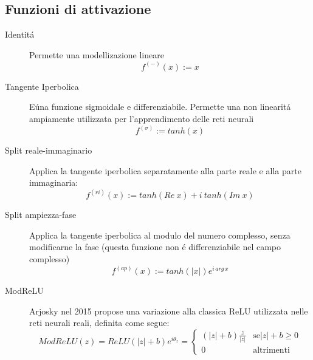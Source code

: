 \documentclass[a4paper,10pt]{article}
\begin{document}
\subsection{Funzioni di attivazione}
\begin{description}
 \item[Identit\'a]
 Permette una modellizazione lineare
 \begin{equation}
  f^{\left(-\right) }\left(x\right) := x
 \end{equation}

 \item[Tangente Iperbolica]
 E\' una funzione sigmoidale e differenziabile. Permette una non linearit\'a ampiamente utilizzata per l'apprendimento delle reti neurali
 \begin{equation}
  f^{\left(\sigma\right) } := tanh\left( x\right)
 \end{equation}

 \item[Split reale-immaginario]
 Applica la tangente iperbolica separatamente alla parte reale e alla parte immaginaria:
 \begin{equation}
  f^{\left( ri\right)} \left( x\right) := tanh\left( Re \ x\right) +i \ tanh\left( Im \ x\right)
 \end{equation}

 \item[Split ampiezza-fase]
 Applica la tangente iperbolica al modulo del numero complesso, senza modificarne la fase (questa funzione non \'e differenziabile nel campo complesso)
 \begin{equation}
  f^{\left( ap\right) } \left( x\right) := tanh\left( \left| x\right|\right) e^{i \, arg \, x}
 \end{equation}
 
 \item[ModReLU]
 Arjosky nel 2015 propose una variazione alla classica ReLU utilizzata nelle reti neurali reali, definita come segue:
 \begin{equation}
  ModReLU\left( z\right) = ReLU\left( \left| z\right|+b\right) e^{i\theta_z} = \begin{cases}
                                                                                               \left(\left| z\right| +b\right) \frac{z}{\left| z\right|} & \mbox{se} \left| z\right| +b \ge 0 \\
                                                                                0 & \mbox{altrimenti}
                                                                

\end{cases}
\end{equation}
\end{description}
\end{document}
